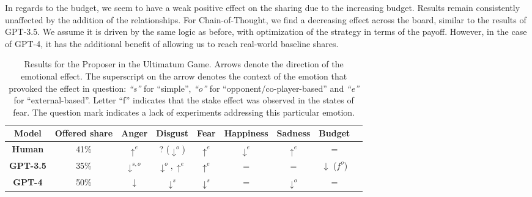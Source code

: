 \documentclass{article}
\begin{document}
In regards to the budget, we seem to have a weak positive effect on the sharing due to the increasing budget. Results remain consistently unaffected by the addition of the relationships. For Chain-of-Thought, we find a decreasing effect across the board, similar to the results of GPT-3.5. We assume it is driven by the same logic as before, with optimization of the strategy in terms of the payoff. However, in the case of GPT-4, it has the additional benefit of allowing us to reach real-world baseline shares. 

\begin{table}[htbp]
\centering
\begin{tabular}{|c|c|c|c|c|c|c|c|c|}
\hline
\textbf{Model} & \textbf{Offered share} & \textbf{Anger} & \textbf{Disgust} & \textbf{Fear}  & \textbf{Happiness} &  \textbf{Sadness} & \textbf{Budget} \\ \hline 
\textbf{Human} & 41\% & $\uparrow^e$ & ? ($\downarrow^o$) & $\uparrow^e$ & $\downarrow^e$  & $\uparrow^e$ & = \\ \hline
\textbf{GPT-3.5} & 35\% & $\downarrow^{s,o}$ & $\downarrow^o, \uparrow^e$ & $\uparrow^e$ & = & = & $\downarrow$ ($f^{o}$) \\ \hline
\textbf{GPT-4} & 50\% & $\downarrow$ & $\downarrow^s$ & $\downarrow^s$ & = & $\downarrow^o$ & = \\ \hline
\end{tabular}
\caption{Results for the Proposer in the Ultimatum Game. Arrows denote the direction of the emotional effect. The superscript on the arrow denotes the context of the emotion that provoked the effect in question: \textit{``s''} for ``simple'', \textit{``o''} for ``opponent/co-player-based'' and \textit{``e''} for ``external-based''. Letter ``f'' indicates that the stake effect was observed in the states of fear. The question mark indicates a lack of experiments addressing this particular emotion.}
\label{tab:utilm_results}
\end{table}
\end{document}

